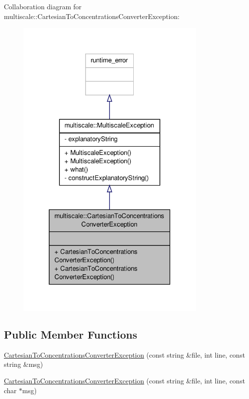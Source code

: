 Collaboration diagram for multiscale\-:\-:Cartesian\-To\-Concentrations\-Converter\-Exception\-:
\nopagebreak
\begin{figure}[H]
\begin{center}
\leavevmode
\includegraphics[width=266pt]{classmultiscale_1_1CartesianToConcentrationsConverterException__coll__graph}
\end{center}
\end{figure}
\subsection*{Public Member Functions}
\begin{DoxyCompactItemize}
\item 
\hyperlink{classmultiscale_1_1CartesianToConcentrationsConverterException_a1c307db0f880fb689b2f777e1d0bee89}{Cartesian\-To\-Concentrations\-Converter\-Exception} (const string \&file, int line, const string \&msg)
\item 
\hyperlink{classmultiscale_1_1CartesianToConcentrationsConverterException_a8d14e1f35af551c85fecc398f34cd125}{Cartesian\-To\-Concentrations\-Converter\-Exception} (const string \&file, int line, const char $\ast$msg)
\end{DoxyCompactItemize}


